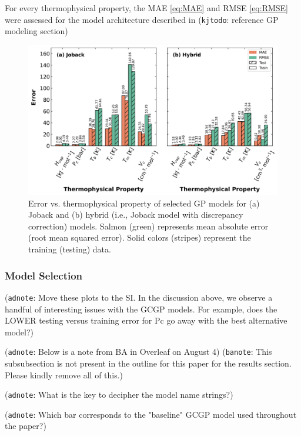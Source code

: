 \documentclass[journal=jacsat,manuscript=article]{achemso}
\newcommand{\kjtodo}[1]{{\color{Red} (\texttt{kjtodo}: #1)}}
\newcommand{\adnote}[1]{{\color{OliveGreen} (\texttt{adnote}: #1)}}
\newcommand{\banote}[1]{{\color{Salmon} (\texttt{banote}: #1)}}
\begin{document}
For every thermophysical property, the MAE \eqref{eq:MAE} and RMSE \eqref{eq:RMSE} were assessed for the model architecture described in \kjtodo{reference GP modeling section}
\begin{figure}
    \centering
    \includegraphics[width=\linewidth]{images/error_bar_chart_shared_yaxis.png}
    \caption{Error vs. thermophysical property of selected GP models for (a) Joback and (b) hybrid (i.e., Joback model with discrepancy correction) models. Salmon (green) represents mean absolute error (root mean squared error). Solid colors (stripes) represent the training (testing) data.}
    \label{fig:enter-label}
\end{figure}
\subsubsection{Model Selection}

\adnote{Move these plots to the SI. In the discussion above, we observe a handful of interesting issues with the GCGP models. For example, does the LOWER testing versus training error for Pc go away with the best alternative model?}

\adnote{Below is a note from BA in Overleaf on August 4}
\banote{This subsubsection is not present in the outline for this paper for the results section. Please kindly remove all of this.}

\adnote{What is the key to decipher the model name strings?}

\adnote{Which bar corresponds to the "baseline" GCGP model used throughout the paper?}
\end{document}
